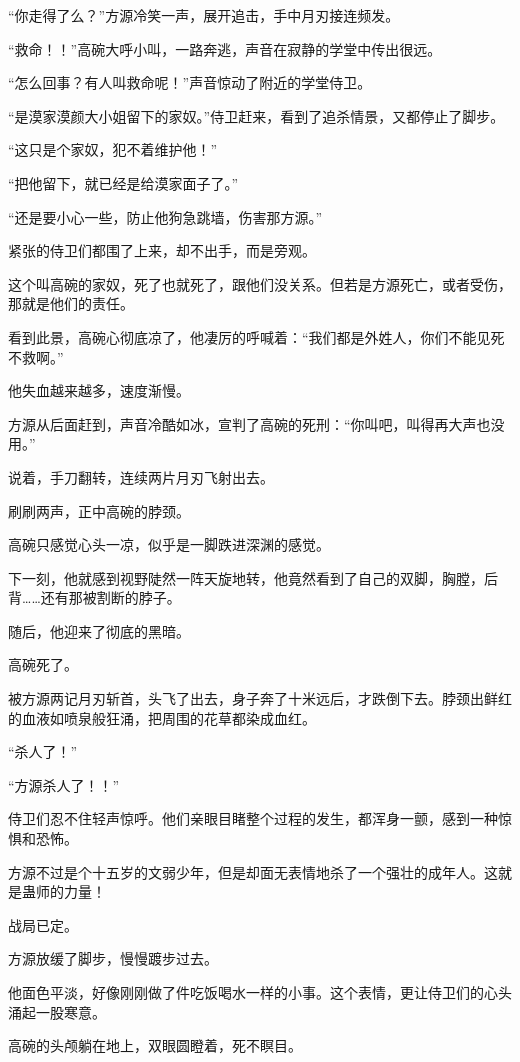 \begin{this_body}
“你走得了么？”方源冷笑一声，展开追击，手中月刃接连频发。

“救命！！”高碗大呼小叫，一路奔逃，声音在寂静的学堂中传出很远。

“怎么回事？有人叫救命呢！”声音惊动了附近的学堂侍卫。

“是漠家漠颜大小姐留下的家奴。”侍卫赶来，看到了追杀情景，又都停止了脚步。

“这只是个家奴，犯不着维护他！”

“把他留下，就已经是给漠家面子了。”

“还是要小心一些，防止他狗急跳墙，伤害那方源。”

紧张的侍卫们都围了上来，却不出手，而是旁观。

这个叫高碗的家奴，死了也就死了，跟他们没关系。但若是方源死亡，或者受伤，那就是他们的责任。

看到此景，高碗心彻底凉了，他凄厉的呼喊着：“我们都是外姓人，你们不能见死不救啊。”

他失血越来越多，速度渐慢。

方源从后面赶到，声音冷酷如冰，宣判了高碗的死刑：“你叫吧，叫得再大声也没用。”

说着，手刀翻转，连续两片月刃飞射出去。

刷刷两声，正中高碗的脖颈。

高碗只感觉心头一凉，似乎是一脚跌进深渊的感觉。

下一刻，他就感到视野陡然一阵天旋地转，他竟然看到了自己的双脚，胸膛，后背……还有那被割断的脖子。

随后，他迎来了彻底的黑暗。

高碗死了。

被方源两记月刃斩首，头飞了出去，身子奔了十米远后，才跌倒下去。脖颈出鲜红的血液如喷泉般狂涌，把周围的花草都染成血红。

“杀人了！”

“方源杀人了！！”

侍卫们忍不住轻声惊呼。他们亲眼目睹整个过程的发生，都浑身一颤，感到一种惊惧和恐怖。

方源不过是个十五岁的文弱少年，但是却面无表情地杀了一个强壮的成年人。这就是蛊师的力量！

战局已定。

方源放缓了脚步，慢慢踱步过去。

他面色平淡，好像刚刚做了件吃饭喝水一样的小事。这个表情，更让侍卫们的心头涌起一股寒意。

高碗的头颅躺在地上，双眼圆瞪着，死不瞑目。


\end{this_body}
